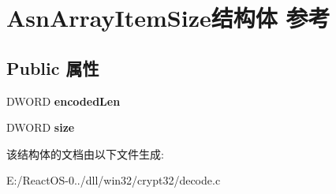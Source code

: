 \hypertarget{struct_asn_array_item_size}{}\section{Asn\+Array\+Item\+Size结构体 参考}
\label{struct_asn_array_item_size}
\subsection*{Public 属性}
\begin{DoxyCompactItemize}
\item 
\mbox{\label{struct_asn_array_item_size_a36d3521aa5d982664c880a170a0c9a06}} 
D\+W\+O\+RD {\bfseries encoded\+Len}
\item 
\mbox{\label{struct_asn_array_item_size_a4e14524e0e8fb612dcadddb552fd0e02}} 
D\+W\+O\+RD {\bfseries size}
\end{DoxyCompactItemize}


该结构体的文档由以下文件生成\+:\begin{DoxyCompactItemize}
\item 
E\+:/\+React\+O\+S-\/0../dll/win32/crypt32/decode.\+c\end{DoxyCompactItemize}
